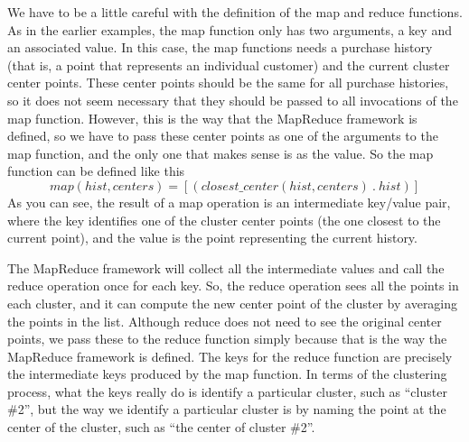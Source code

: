 We have to be a little careful with the definition of the map and reduce functions.
As in the earlier examples, the map function only has two arguments, a key and an
associated value.  In this case, the map functions needs a purchase history 
(that is, a point that represents an individual customer) and the current cluster center
points.  These center points should be the same for all purchase histories, so
it does not seem necessary that they should be passed to all invocations of the
map function.  However, this is the way that the MapReduce framework is defined,
so we have to pass these center points as one of the arguments to the map function, 
and the only one that makes sense is as the value. So the map function can be
defined like this
\begin{displaymath}
map(hist, centers) = [ ( closest\_center(hist, centers) ~.~ hist ) ]
\end{displaymath}
As you can see, the result of a map operation is an intermediate key/value pair, 
where the key identifies one of the cluster center points (the one closest to the
current point), and the value is the point representing the current history.


The MapReduce framework will collect all the intermediate values and call the reduce
operation once for each key.  So, the reduce operation sees all the points in each
cluster, and it can compute the new center point of the cluster by averaging the points
in the list.  Although reduce does not need to see the original center points, we pass
these to the reduce function simply because that is the way the MapReduce framework is
defined. The keys for the reduce function are precisely the intermediate keys produced
by the map function. In terms of the clustering process, what the keys really do is
identify a particular cluster, such as ``cluster \#2'', but the way we identify a particular
cluster is by naming the point at the center of the cluster, such as ``the center of
cluster \#2''.



